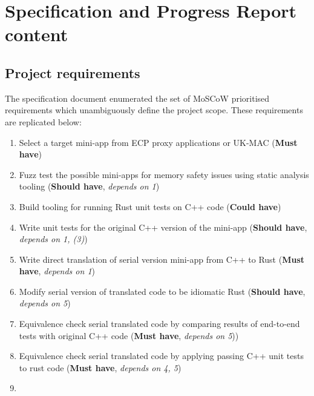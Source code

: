 \appendix

\chapter{Specification and Progress Report content}
\label{ch:specification-progress-report-content}

\section{Project requirements}
\label{sec:project-requirements}

The specification document enumerated the set of MoSCoW prioritised \cite{CaseMethodFastTrack} requirements which unambiguously define the project scope. These requirements are replicated below:

\begin{enumerate}
\item
  Select a target mini-app from ECP proxy applications or UK-MAC
  (\textbf{Must have})
\item
  Fuzz test
  the possible mini-apps for memory safety issues using static analysis tooling \cite{stepanovMemorySanitizerFastDetector2015}
  (\textbf{Should have}, \textit{depends on 1})
\item
  Build tooling for running Rust unit tests on C++ code
  (\textbf{Could have})
\item
  Write unit tests for the original C++ version of the
  mini-app
  (\textbf{Should have}, \textit{depends on 1, (3)})
\item
  Write direct translation of serial version mini-app from C++ to Rust
  (\textbf{Must have}, \textit{depends on 1})
\item
  Modify serial version of translated code to be idiomatic Rust \cite{endlerMreIdiomaticrust2023} 
  (\textbf{Should have}, \textit{depends on 5})
\item
  Equivalence check serial translated code by comparing results of end-to-end tests with original C++ code
  (\textbf{Must have}, \textit{depends on 5}))
\item
  Equivalence check serial translated code by applying passing C++ unit tests to rust code
  (\textbf{Must have}, \textit{depends on 4, 5})
\item

\end{enumerate}
